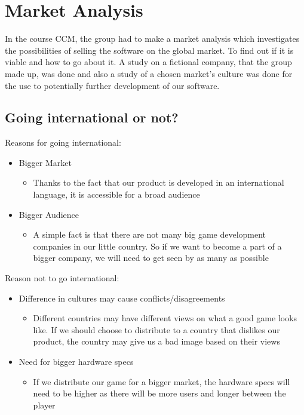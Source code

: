 \chapter{Market Analysis}
	In the course CCM, the group had to make a market analysis which
   investigates the possibilities of selling the software on the global
   market. To find out if it is viable and how to go about it. A study
    on a fictional company, that the group made up, was done and also a
     study of a chosen market’s culture was done for the use to potentially
      further development of our software.
	\\
	\section{Going international or not?}
	Reasons for going international:
	\begin{itemize}
		\item Bigger Market
		\begin{itemize}
			\item Thanks to the fact that our product is developed in an
       international language, it is accessible for a broad audience
		\end{itemize}
		\item Bigger Audience
		\begin{itemize}
			\item A simple fact is that there are not many big game development
       companies in our little country. So if we want to become a part of
        a bigger company, we will need to get seen by as many as possible
		\end{itemize}
	\end{itemize}
	Reason not to go international:
	\begin{itemize}
		\item Difference in cultures may cause conflicts/disagreements
		\begin{itemize}
			\item Different countries may have different views on what a good game
       looks like. If we should choose to distribute to a country that
        dislikes our product, the country may give us a bad image based
         on their views
		\end{itemize}
	\end{itemize}
	\begin{itemize}
		\item Need for bigger hardware specs
			\begin{itemize}
				\item If we distribute our game for a bigger market, the hardware
         specs will need to be higher as there will be more users and
          longer between the player
			\end{itemize}
	\end{itemize}
